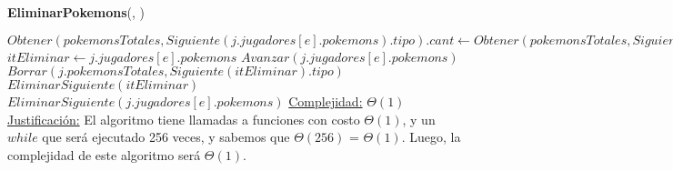 \begin{algorithm}[H]{\textbf{EliminarPokemons}(, )}  
    \begin{algorithmic}[1]
            \State $Obtener(pokemonsTotales, Siguiente(j.jugadores[e].pokemons).tipo).cant \gets Obtener(pokemonsTotales, Siguiente(j.jugadores[e].pokemons).tipo).cant - Siguiente(j.jugadores[e].pokemons).cant$
                \State $itEliminar \gets j.jugadores[e].pokemons$
                \State $Avanzar(j.jugadores[e].pokemons)$
                \State $Borrar(j.pokemonsTotales, Siguiente(itEliminar).tipo)$
                \State $EliminarSiguiente(itEliminar)$
            \Else
                \State $EliminarSiguiente(j.jugadores[e].pokemons)$
            \EndIf      
        \EndWhile
        \medskip
        \Statex \underline{Complejidad:} $\Theta(1)$
        \Statex \underline{Justificación:}  El algoritmo tiene llamadas a funciones con costo $\Theta(1)$, y un $while$ que será ejecutado 256 veces, y sabemos que $\Theta (256)$ = $\Theta (1)$. Luego, la complejidad de este algoritmo será $\Theta (1)$.
    \end{algorithmic}
\end{algorithm} 

